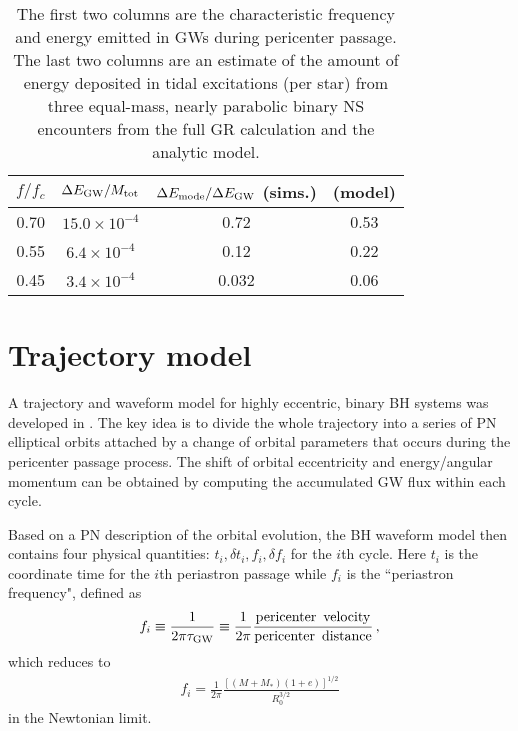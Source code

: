 \documentclass[prd,aps,floatfix,superscriptaddress,nofootinbib,twocolumn,10pt,English]{revtex4}
\begin{document}
\begin{table}[h!]
  \centering
  \caption{ 
    The first two columns are the characteristic frequency and energy emitted in GWs during pericenter
    passage. The last two columns are an estimate of the amount of energy deposited in tidal excitations
    (per star) from three equal-mass, nearly parabolic binary NS encounters from the
    full GR calculation and the analytic model.
    }
  \label{tab:emode}
  \begin{tabular}{c|c|c|c}
    \hline
      $f/f_c$ & $\Delta E_{\rm GW}/M_{\rm tot}$ & $\Delta E_{\rm mode}/\Delta E_{\rm GW}$ (sims.) & 
      (model)\\
    \hline
      0.70 & $15.0\times10^{-4}$& 0.72 & 0.53 \\
    0.55 & $6.4\times10^{-4}$   & 0.12   & 0.22 \\
    0.45 & $3.4\times10^{-4}$   & 0.032   & 0.06 \\
  \end{tabular}
\end{table}


\section{Trajectory model}\label{sec5}
%
A trajectory and waveform model for highly eccentric, binary BH systems was
developed in \cite{loutrel2017eccentric}. The key idea is to divide the whole
trajectory into a series of PN elliptical orbits attached by a change of orbital
parameters that occurs during the pericenter
passage process. The shift of orbital eccentricity and energy/angular
momentum can be obtained by computing the accumulated GW flux within each cycle. 

Based on a PN description of the orbital evolution, the BH waveform model then
contains four physical quantities: $t_i, \delta t_i, f_i, \delta f_i$ for the
$i$th cycle. Here $t_i$ is the coordinate time for the $i$th periastron
passage while $f_i$ is the ``periastron frequency", defined as
\cite{loutrel2017eccentric}
\begin{align}
f_i  \equiv \frac{1}{2 \pi \tau_{\rm GW}} \equiv \frac{1}{2 \pi} \frac{\rm pericenter \,\,\,velocity}{\rm pericenter \,\,\, distance}\,,
\end{align}
which reduces to
\begin{align}
f_i =\frac{1}{2 \pi} \frac{[(M+M_*)(1+e)]^{1/2}}{R_0^{3/2}}
\end{align}
in the Newtonian limit. 
\end{document}
